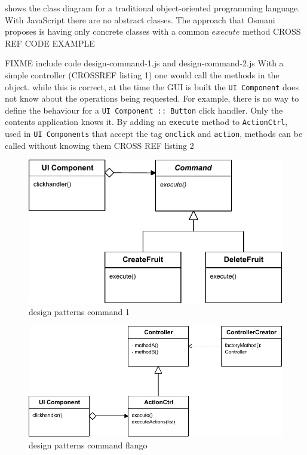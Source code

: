  shows the class diagram for a traditional object-oriented programming language.
With JavaScript there are no abstract classes.
The approach that Osmani proposes is having only concrete classes with a common $execute$ method \cite{Osmani:2012} CROSS REF CODE EXAMPLE

FIXME include code design-command-1.js and design-command-2.js
With a simple controller (CROSSREF listing 1) one would call the methods in the object.
while this is correct, at the time the \ac{GUI} is built the \texttt{UI Component} does not know about the operations being requested.
For example, there is no way to define the behaviour for a \texttt{UI Component :: Button} click handler.
Only the contents application knows it.
By adding an \texttt{execute} method to \texttt{ActionCtrl}, used in \texttt{UI Components} that accept the tag \texttt{onclick} and \texttt{action}, methods can be called without knowing them CROSS REF listing 2

\begin{figure}[htb]
    \centering
    \includegraphics{figures/design-patterns-command-1.pdf}
    \caption{design patterns command 1}
    \label{fig:context-original}
\end{figure}

\begin{figure}[htb]
    \centering
    \includegraphics{figures/design-patterns-command-flango.pdf}
    \caption{design patterns command flango}
    \label{fig:context-original}
\end{figure}


